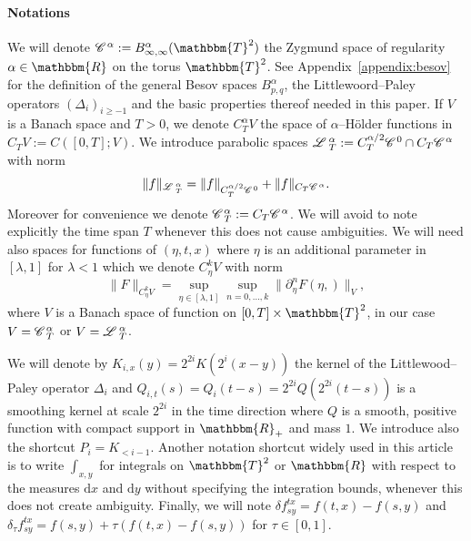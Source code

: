 \documentclass[11pt,reqno]{amsart}
\newcommand{\assign}{:=}
\newcommand{\mathd}{\mathrm{d}}
\newcommand{\CC}{\mathscr{C} \hspace{.1em}}
\newcommand{\LL}{\mathscr{L} \hspace{.2em}}
\begin{document}
\

\paragraph{Notations}We will denote $\CC^{\alpha} \assign B^{\alpha}_{\infty,
\infty} (\mathbbm{T}^2)$ the Zygmund space of regularity $\alpha \in
\mathbbm{R}$ on the torus $\mathbbm{T}^2$. See Appendix~\ref{appendix:besov}
for the definition of the general Besov spaces $B^{\alpha}_{p, q}$, the
Littlewoord--Paley operators $(\Delta_i)_{i \geqslant - 1}$ and the basic
properties thereof needed in this paper. If $V$ is a Banach space and $T > 0$,
we denote $C_T^{\alpha} V$ the space of $\alpha$--H{\"o}lder functions in $C_T
V \assign C ([0, T] ; V)$. We introduce parabolic spaces $\LL^{\alpha}_T
\assign C_T^{\alpha / 2} \CC^0 \cap C_T \CC^{\alpha}$ with norm
\begin{equation}
  \| f \|_{\LL^{\alpha}_T} = \| f \|_{C_T^{\alpha / 2} \CC^0} + \| f \|_{C_T
  \CC^{\alpha}} . \label{e:def-Lnorm}
\end{equation}
Moreover for convenience we denote $\CC_T^{\alpha} \assign C_T \CC^{\alpha}$.
We will avoid to note explicitly the time span $T$ whenever this does not
cause ambiguities. We will need also spaces for functions of $(\eta, t, x)$
where $\eta$ is an additional parameter in $[\lambda, 1]$ for $\lambda < 1$
which we denote $C_{\eta}^k V$ with norm
\begin{equation}
  \| F \|_{C_{\eta}^k V} = \sup_{\eta \in [\lambda, 1]} \sup_{n = 0, \ldots,
  k} \| \partial_{\eta}^n F (\eta,) \|_V, \label{e:def-Cetanorm}
\end{equation}
where $V$ is a Banach space of function on $[0, T] \times \mathbbm{T}^2$, in
our case $V = \CC_T^{\alpha}$ or $V = \LL^{\alpha}_T$.

We will denote by $K_{i, x} (y) = 2^{2 i} K (2^i (x - y))$ the kernel of the
Littlewood--Paley operator $\Delta_i$ and $Q_{i, t} (s) = Q_i (t - s) = 2^{2
i} Q (2^{2 i} (t - s))$ is a smoothing kernel at scale $2^{2 i}$ in the time
direction where $Q$ is a smooth, positive function with compact support in
$\mathbbm{R}_+$ and mass $1$. We introduce also the shortcut $P_i = K_{< i -
1}$. Another notation shortcut widely used in this article is to write
$\int_{x, y}$ for integrals on $\mathbbm{T}^2$ or $\mathbbm{R}$ with respect
to the measures $\mathd x$ and $\mathd y$ without specifying the integration
bounds, whenever this does not create ambiguity. Finally, we will note $\delta
f^{t x}_{s y} = f (t, x) - f (s, y)$ and $\delta_{\tau} f_{s y}^{t x} = f (s,
y) + \tau (f (t, x) - f (s, y))$ for $\tau \in [0, 1]$.
\end{document}
